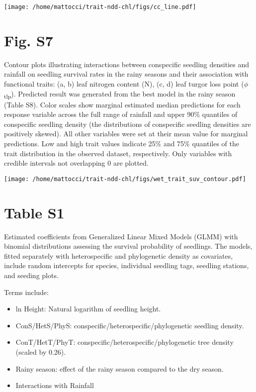 \documentclass[
  12pt,
  letterpaper,
  DIV=11,
  numbers=noendperiod]{scrartcl}
\providecommand{\tightlist}{%
  \setlength{\itemsep}{0pt}\setlength{\parskip}{0pt}}\usepackage{longtable,booktabs,array}
\begin{document}
\texttt{[image: /home/mattocci/trait-ndd-chl/figs/cc\_line.pdf]}

\newpage

\hypertarget{fig.-s7}{%
\section{Fig. S7}\label{fig.-s7}}

Contour plots illustrating interactions between conspecific seedling
densities and rainfall on seedling survival rates in the rainy seasons
and their association with functional traits: (a, b) leaf nitrogen
content (N), (c, d) leaf turgor loss point
(\(\phi\)\textsubscript{tlp}). Predicted result was generated from the
best model in the rainy season (Table S8). Color scales show marginal
estimated median predictions for each response variable across the full
range of rainfall and upper 90\% quantiles of conspecific seedling
density (the distributions of conspecific seedling densities are
positively skewed). All other variables were set at their mean value for
marginal predictions. Low and high trait values indicate 25\% and 75\%
quantiles of the trait distribution in the observed dataset,
respectively. Only variables with credible intervals not overlapping 0
are plotted.

\texttt{[image: /home/mattocci/trait-ndd-chl/figs/wet\_trait\_suv\_contour.pdf]}

\newpage

\hypertarget{table-s1}{%
\section{Table S1}\label{table-s1}}

Estimated coefficients from Generalized Linear Mixed Models (GLMM) with
binomial distributions assessing the survival probability of seedlings.
The models, fitted separately with heterospecific and phylogenetic
density as covariates, include random intercepts for species, individual
seedling tags, seedling stations, and seeding plots.

Terms include:

\begin{itemize}
\tightlist
\item
  ln Height: Natural logarithm of seedling height.
\item
  ConS/HetS/PhyS: conspecific/heterospecific/phylogenetic seedling
  density.
\item
  ConT/HetT/PhyT: conspecific/heterospecific/phylogenetic tree density
  (scaled by 0.26).
\item
  Rainy season: effect of the rainy season compared to the dry season.
\item
  Interactions with Rainfall
\end{itemize}
\end{document}
